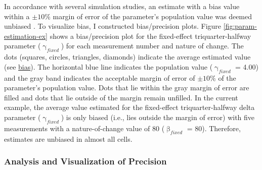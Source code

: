 \documentclass[
12pt, %
twoside,
english]{guelphthesis}
\begin{document}
In accordance with several simulation studies, an estimate with a bias value within a \(\pm10\%\) margin of error of the parameter's population value was deemed unbiased \autocite{muthen1997}. To visualize bias, I constructed bias/precision plots. Figure \ref{fig:param-estimation-ex} shows a bias/precision plot for the fixed-effect triquarter-halfway parameter (\(\upgamma_{fixed}\)) for each measurement number and nature of change. The dots (squares, circles, triangles, diamonds) indicate the average estimated value (see \protect\hyperlink{bias-comp}{bias}). The horizontal blue line indicates the population value (\(\upgamma_{fixed}\) = 4.00) and the gray band indicates the acceptable margin of error of \(\pm10\%\) of the parameter's population value. Dots that lie within the gray margin of error are filled and dots that lie outside of the margin remain unfilled. In the current example, the average value estimated for the fixed-effect triquarter-halfway delta parameter (\(\upgamma_{fixed}\)) is only biased (i.e., lies outside the margin of error) with five measurements with a nature-of-change value of 80 (\(\upbeta_{fixed}\) = 80). Therefore, estimates are unbiased in almost all cells.

\hypertarget{precision-analysis}{%
\subsubsection{Analysis and Visualization of Precision}\label{precision-analysis}}
\end{document}
